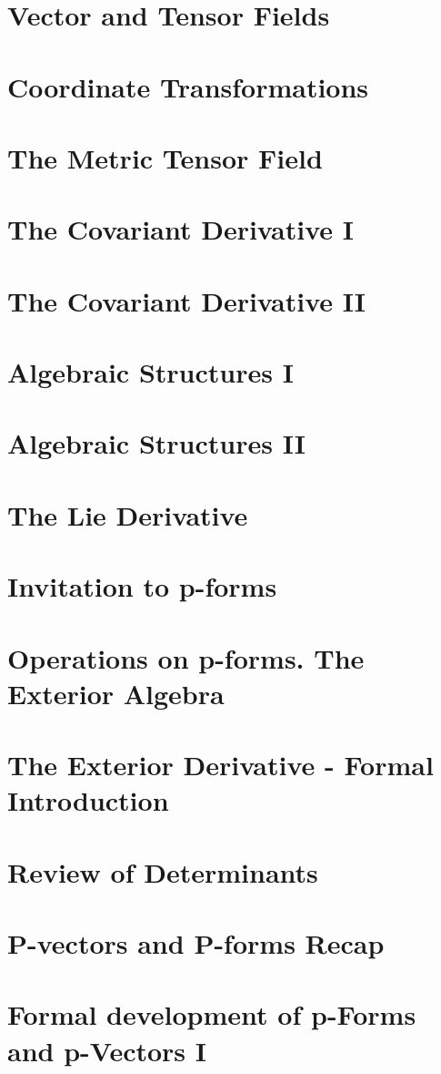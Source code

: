 \documentclass{article}
\begin{document}
\section{Vector and Tensor Fields}
\section{Coordinate Transformations}
\section{The Metric Tensor Field}
\section{The Covariant Derivative I}
\section{The Covariant Derivative II}
\section{Algebraic Structures I}
\section{Algebraic Structures II}
\section{The Lie Derivative}
\section{Invitation to p-forms}
\section{Operations on p-forms. The Exterior Algebra}
\section{The Exterior Derivative - Formal Introduction}
\section{Review of Determinants}
\section{P-vectors and P-forms Recap}
\section{Formal development of p-Forms and p-Vectors I}
\end{document}
